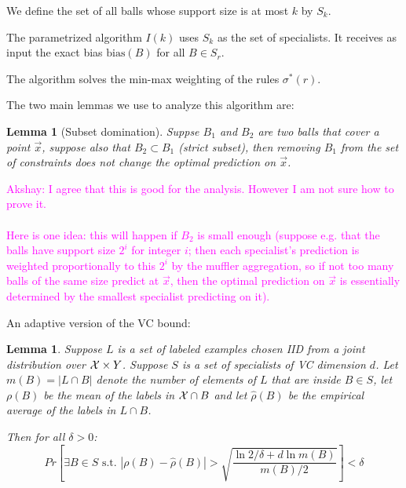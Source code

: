 \documentclass{article}
\newtheorem{lemma}[theorem]{Lemma}
\newcommand{\X}{{\cal X}}
\newcommand{\x}{\vec{x}}
\newcommand{\emprho}{\hat{\rho}}
\newcommand{\bias}{\text{bias}}
\newcommand{\akshay}[1]{\textcolor{magenta}{Akshay: #1}}
\begin{document}
We define the set of all balls whose support size is at most $k$ by $S_k$.

The parametrized algorithm $I(k)$ uses $S_k$ as the set of specialists. 
It receives as input the exact bias $\bias(B)$ for all $B \in S_r$.

The algorithm solves the min-max weighting of the rules $\sigma^*(r)$.

The two main lemmas we use to analyze this algorithm are:
\begin{lemma}[Subset domination]
  Suppse $B_1$ and $B_2$ are two balls that cover a point $\x$,
  suppose also that $B_2 \subset B_1$ (strict subset), then
  removing $B_1$ from the set of constraints does not change the
  optimal prediction on $\x$.
\end{lemma}

\akshay{I agree that this is good for the analysis. However I am not sure how to prove it. \\ \\
Here is one idea: this will happen if $B_2$ is small enough (suppose e.g. 
that the balls have support size $2^i$ for integer $i$; then each specialist's prediction is  
weighted proportionally to this $2^i$ by the muffler aggregation, 
so if not too many balls of the same size predict at $\x$, 
then the optimal prediction on $\x$ is essentially determined by the smallest specialist predicting on it). 
}

An adaptive version of the VC bound:
\begin{lemma}
Suppose $L$ is a set of labeled examples chosen IID from a
joint distribution over $\X \times Y$. Suppose $S$ is a set of
specialists of VC dimension $d$.
Let $m(B)=|L \cap B|$ denote the number of elements of $L$ that are
inside $B \in S$, let $\rho(B)$ be the mean of the labels in $\X \cap B$ and
let $\emprho(B)$ be the empirical average of the labels in $L \cap B$. 

Then for all $\delta>0$:
$$
Pr\left[ \exists B\in S \text{ s.t. }  |\rho(B) - \emprho(B)| >
  \sqrt{\frac{\ln 2/\delta+d \ln m(B)}{m(B)/2}} \right] < \delta
$$
\end{lemma}
\end{document}
